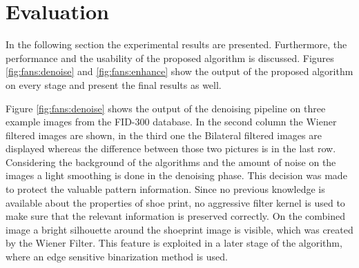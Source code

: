 \documentclass[draft,final]{vutinfth} %
\begin{document}
\section{Evaluation}
\par
In the following section the experimental results are presented.
Furthermore, the performance and the usability of the proposed algorithm is discussed.
Figures \ref{fig:fans:denoise} and \ref{fig:fans:enhance} show the output of the proposed algorithm on every stage and present the final results as well.
\par
Figure \ref{fig:fans:denoise} shows the output of the denoising pipeline on three example images from the FID-300 database.
In the second column the Wiener filtered images are shown, in the third one the Bilateral filtered images are displayed whereas the difference between those two pictures is in the last row.
Considering the background of the algorithms and the amount of noise on the images a light smoothing is done in the denoising phase.
This decision was made to protect the valuable pattern information.
Since no previous knowledge is available about the properties of shoe print, no aggressive filter kernel is used to make sure that the relevant information is preserved correctly.
On the combined image a bright silhouette around the shoeprint image is visible, which was created by the Wiener Filter.
This feature is exploited in a later stage of the algorithm, where an edge sensitive binarization method is used.
\end{document}
